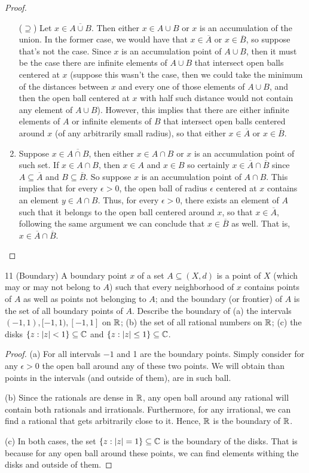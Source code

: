 \begin{proof}
\begin{enumerate}
    ($\supseteq$) Let $x\in\overline{A\cup B}$. Then either $x\in A\cup B$ or $x$ is an accumulation of the union. In the former case, we would have that $x\in\overline{A}$ or $x\in\overline{B}$, so suppose that's not the case. Since $x$ is an accumulation point of $A\cup B$, then it must be the case there are infinite elements of $A\cup B$ that intersect open balls centered at $x$ (suppose this wasn't the case, then we could take the minimum of the distances between $x$ and every one of those elements of $A\cup B$, and then the open ball centered at $x$ with half such distance would not contain any element of $A\cup B$). However, this implies that there are either infinite elements of $A$ or infinite elements of $B$ that intersect open balls centered around $x$ (of any arbitrarily small radius), so that either $x\in\overline{A}$ or $x\in\overline{B}$.
    \item Suppose $x\in\overline{A\cap B}$, then either $x\in A\cap B$ or $x$ is an accumulation point of such set. If $x\in A\cap B$, then $x\in A$ and $x\in B$ so certainly $x\in\overline{A}\cap\overline{B}$ since $A\subseteq\overline{A}$ and $B\subseteq\overline{B}$. So suppose $x$ is an accumulation point of $A\cap B$. This implies that for every $\epsilon>0$, the open ball of radius $\epsilon$ centered at $x$ contains an element $y\in A\cap B$. Thus, for every $\epsilon>0$, there exists an element of $A$ such that it belongs to the open ball centered around $x$, so that $x\in\overline{A}$, following the same argument we can conclude that $x\in\overline{B}$ as well. That is, $x\in\overline{A}\cap\overline{B}$.
    \end{enumerate}
\end{proof}

\begin{exercise}{11 (Boundary)}
A boundary point $x$ of a set $A\subseteq (X,d)$ is a point of $X$ (which may or may not belong to $A$) such that every neighborhood of $x$ contains points of $A$ as well as points not belonging to $A$; and the boundary (or frontier) of $A$ is the set of all boundary points of $A$. Describe the boundary of (a) the intervals $(-1,1), [-1,1), [-1,1]$ on $\mathbb{R}$; (b) the set of all rational numbers on $\mathbb{R}$; (c) the disks $\{z:\left\lvert z\right\rvert<1\}\subseteq\mathbb{C}$ and $\{z:\left\lvert z\right\rvert\leq 1\}\subseteq\mathbb{C}$.
\end{exercise}
\begin{proof}
(a) For all intervals $-1$ and 1 are the boundary points. Simply consider for any $\epsilon>0$ the open ball around any of these two points. We will obtain than points in the intervals (and outside of them), are in such ball.

(b) Since the rationals are dense in $\mathbb{R}$, any open ball around any rational will contain both rationals and irrationals. Furthermore, for any irrational, we can find a rational that gets arbitrarily close to it. Hence, $\mathbb{R}$ is the boundary of $\mathbb{R}$.

(c) In both cases, the set $\{z:\left\lvert z\right\rvert=1\}\subseteq\mathbb{C}$ is the boundary of the disks. That is because for any open ball around these points, we can find elements withing the disks and outside of them.
\end{proof}

